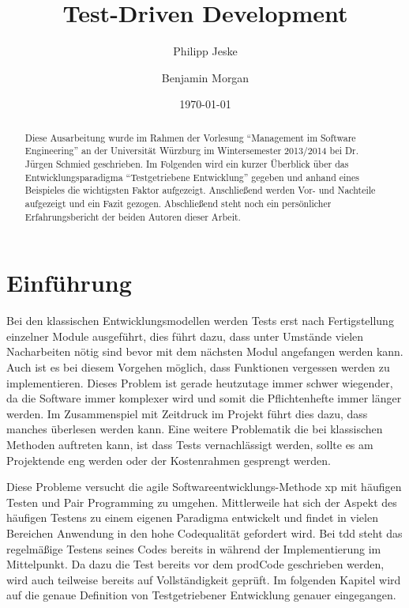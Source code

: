 \documentclass{mitschrift}
\title{Test-Driven Development}
\author{Philipp Jeske \and Benjamin Morgan}
\date{\today}
\newcommand{\pje}{\marginpar{Philipp\\Jeske}}
\begin{document}
\maketitle

\tableofcontents

\begin{abstract}
 Diese Ausarbeitung wurde im Rahmen der Vorlesung "`Management im Software
 Engineering"' an der Universität Würzburg im Wintersemester 2013/2014 bei Dr.
 Jürgen Schmied geschrieben. Im Folgenden wird ein kurzer Überblick über das
 Entwicklungsparadigma "`Testgetriebene Entwicklung"' gegeben und anhand eines
 Beispieles die wichtigsten Faktor aufgezeigt. Anschließend werden Vor- und
 Nachteile aufgezeigt und ein Fazit gezogen. Abschließend steht noch ein
 persönlicher Erfahrungsbericht der beiden Autoren dieser Arbeit.
\end{abstract}

\chapter{Einführung}\label{Einführung}\pje
Bei den klassischen Entwicklungsmodellen werden Tests erst nach Fertigstellung
einzelner Module ausgeführt, dies führt dazu, dass unter Umstände vielen
Nacharbeiten nötig sind bevor mit dem nächsten Modul angefangen werden kann.
Auch ist es bei diesem Vorgehen möglich, dass Funktionen vergessen werden zu
implementieren. Dieses Problem ist gerade heutzutage immer schwer wiegender, da
die Software immer komplexer wird und somit die Pflichtenhefte immer länger
werden. Im Zusammenspiel mit Zeitdruck im Projekt führt dies dazu, dass manches
überlesen werden kann. Eine weitere Problematik die bei klassischen Methoden
auftreten kann, ist dass Tests vernachlässigt werden, sollte es am Projektende
eng werden oder der Kostenrahmen gesprengt werden.

Diese Probleme versucht die agile Softwareentwicklungs-Methode \gls{xp} mit
häufigen Testen und Pair Programming zu umgehen. Mittlerweile hat sich der
Aspekt des häufigen Testens zu einem eigenen Paradigma entwickelt und findet in
vielen Bereichen Anwendung in den hohe Codequalität gefordert wird. Bei
\gls{tdd} steht das regelmäßige Testens seines Codes bereits in während der
Implementierung im Mittelpunkt. Da dazu die Test bereits vor dem \gls{prodCode}
geschrieben werden, wird auch teilweise bereits auf Vollständigkeit geprüft. Im
folgenden Kapitel wird auf die genaue Definition von Testgetriebener
Entwicklung genauer eingegangen.
\end{document}
